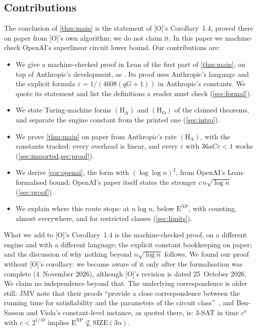 \documentclass[10pt]{amsart}
\theoremstyle{plain}
\theoremstyle{definition}
\theoremstyle{remark}
\numberwithin{equation}{section}
\newcommand{\ENP}{\mathrm{E}^{\mathrm{NP}}}
\newcommand{\SIZE}{\mathrm{SIZE}}
\newcommand{\Oa}{\textup{[O]}}
\begin{document}
\subsection{Contributions}
The conclusion of \cref{thm:main} is the statement of \Oa's Corollary~1.4, proved there on paper
from \Oa's own algorithm; we do not claim it.
In this paper we machine-check OpenAI's superlinear circuit lower bound. Our contributions are:
\begin{itemize}
\item We give a machine-checked proof in Lean of the first part of \cref{thm:main}, on top of
Anthropic's development, as . Its proof uses Anthropic's language
 and the explicit formula $\varepsilon=1/(4608(qG+1))$ in Anthropic's
constants. We
quote its statement and list the definitions a reader must check (\cref{sec:formal}).
\item We state Turing-machine forms $(\mathrm{H}_{\mathrm{A}})$ and $(\mathrm{H}_{\mathrm{O}})$ of the
claimed theorems, and separate the engine constant from the printed one (\cref{sec:intro}).
\item We prove \cref{thm:main} on paper from Anthropic's rate $(\mathrm{H}_{\mathrm{A}})$, with the
constants tracked: every overhead is linear, and every $\varepsilon$ with $36aC\varepsilon<1$ works
(\cref{sec:imported,sec:proof}).
\item We derive \cref{cor:openai}, the form with $(\log\log n)^2$, from OpenAI's Lean-formalised
bound; OpenAI's paper itself states the stronger $c\,n\sqrt{\log n}$ (\cref{sec:proof}).
\item We explain where this route stops: at $n\log n$, below $\ENP$, with counting, almost everywhere,
and for restricted classes (\cref{sec:limits}).
\end{itemize}
What we add to \Oa's Corollary~1.4 is the machine-checked proof, on a different engine and with a
different language; the explicit constant bookkeeping on paper; and the discussion of why nothing
beyond $n\sqrt{\log n}$ follows. We found our proof without \Oa's corollary: we became aware of it
only after the formalisation was complete (4~November 2026), although \Oa's revision is dated
25~October 2026. We claim no independence beyond that. The underlying correspondence is older still:
JMV note that their proofs ``provide a close correspondence between the running time for
satisfiability and the parameters of the circuit class''~\cite{JMV15}, and Ben-Sasson and Viola's
constant-level instance, as quoted there, is: $3$-SAT in time $c^n$ with $c<2^{1/10}$ implies
$\ENP\not\subseteq\SIZE(3n)$.
\end{document}
